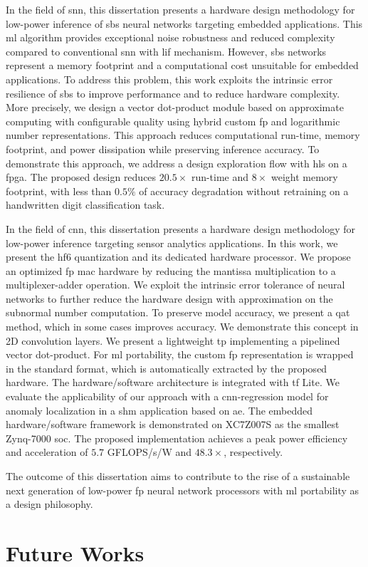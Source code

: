 In the field of \gls{snn}, this dissertation presents a hardware design methodology for low-power inference of \gls{sbs} neural networks targeting embedded applications. This \gls{ml} algorithm provides exceptional noise robustness and reduced complexity compared to conventional \gls{snn} with \gls{lif} mechanism. However, \gls{sbs} networks represent a memory footprint and a computational cost unsuitable for embedded applications. To address this problem, this work exploits the intrinsic error resilience of \gls{sbs} to improve performance and to reduce hardware complexity. More precisely, we design a vector dot-product module based on approximate computing with configurable quality using hybrid custom \gls{fp} and logarithmic number representations. This approach reduces computational run-time, memory footprint, and power dissipation while preserving inference accuracy. To demonstrate this approach, we address a design exploration flow with \gls{hls} on a \gls{fpga}. The proposed design reduces $20.5\times$ run-time and $8\times$ weight memory footprint, with less than $0.5\%$ of accuracy degradation without retraining on a handwritten digit classification task.

In the field of \gls{cnn}, this dissertation presents a hardware design methodology for low-power inference targeting sensor analytics applications. In this work, we present the \gls{hf6} quantization and its dedicated hardware processor. We propose an optimized \gls{fp} \gls{mac} hardware by reducing the mantissa multiplication to a multiplexer-adder operation. We exploit the intrinsic error tolerance of neural networks to further reduce the hardware design with approximation on the subnormal number computation. To preserve model accuracy, we present a \gls{qat} method, which in some cases improves accuracy. We demonstrate this concept in 2D convolution layers. We present a lightweight \gls{tp} implementing a pipelined vector dot-product. For \gls{ml} portability, the custom \gls{fp} representation is wrapped in the standard format, which is automatically extracted by the proposed hardware. The hardware/software architecture is integrated with \gls{tf} Lite. We evaluate the applicability of our approach with a \gls{cnn}-regression model for anomaly localization in a \gls{shm} application based on \gls{ae}. The embedded hardware/software framework is demonstrated on XC7Z007S as the smallest Zynq-7000 \gls{soc}. The proposed implementation achieves a peak power efficiency and acceleration of $5.7$ GFLOPS/s/W and $48.3\times$, respectively.

The outcome of this dissertation aims to contribute to the rise of a sustainable next generation of low-power \gls{fp} neural network processors with \gls{ml} portability as a design philosophy.

\section{Future Works}




